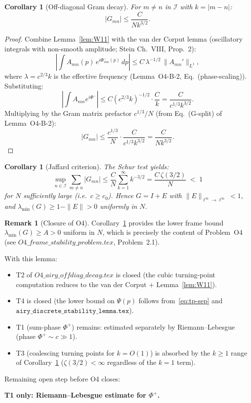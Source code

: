 \documentclass[12pt,a4paper]{amsart}
\newtheorem{corollary}[theorem]{Corollary}
\theoremstyle{definition}
\newtheorem{remark}[theorem]{Remark}
\newcommand{\norm}[1]{\|#1\|}
\newcommand{\dd}{\,d}
\begin{document}
\begin{corollary}[Off-diagonal Gram decay]\label{cor:offdiag}
For $m \neq n$ in $\mathcal{I}$ with $k = |m-n|$:
\[
  |G_{mn}| \leq \frac{C}{N k^{3/2}}.
\]
\end{corollary}

\begin{proof}
Combine Lemma~\ref{lem:W11} with the van der Corput
lemma (oscillatory integrals with non-smooth amplitude;
Stein \cite{Stein1993} Ch.~VIII, Prop.~2):
\[
  \left|\int A_{mn}(p)\, e^{i\Phi^-_{mn}(p)}\dd p\right|
  \leq C\, \lambda^{-1/2}\,\norm{A_{mn}'}_{L^1},
\]
where $\lambda = c^{2/3}k$ is the effective frequency
(Lemma~O4-B-2, Eq.~(phase-scaling)).
Substituting:
\[
  \left|\int A_{mn} e^{i\Phi^-}\right|
  \leq C(c^{2/3}k)^{-1/2}\cdot\frac{C}{k}
  = \frac{C}{c^{1/3} k^{3/2}}.
\]
Multiplying by the Gram matrix prefactor $c^{1/3}/N$
(from Eq.~(G-split) of Lemma~O4-B-2):
\[
  |G_{mn}| \leq \frac{c^{1/3}}{N}\cdot\frac{C}{c^{1/3}k^{3/2}}
  = \frac{C}{Nk^{3/2}}.
\]
\end{proof}

\begin{corollary}[Jaffard criterion]\label{cor:jaffard}
The Schur test yields:
\[
  \sup_{n \in \mathcal{I}}\sum_{m \neq n} |G_{mn}|
  \leq \frac{C}{N}\sum_{k=1}^{\infty} k^{-3/2}
  = \frac{C\,\zeta(3/2)}{N}
  \;<\; 1
\]
for $N$ sufficiently large (i.e.\ $c \geq c_0$).
Hence $G = I + E$ with $\|E\|_{\ell^\infty \to \ell^\infty} < 1$,
and $\lambda_{\min}(G) \geq 1 - \|E\| > 0$ uniformly in $N$.
\end{corollary}

\begin{remark}[Closure of O4]
Corollary~\ref{cor:jaffard} provides the lower frame bound
$\lambda_{\min}(G) \geq A > 0$ uniform in $N$,
which is precisely the content of Problem~O4
(see $O4\_frame\_stability\_problem.tex$, Problem~2.1).

With this lemma:
\begin{itemize}
  \item T2 of $O4\_airy\_offdiag\_decay.tex$ is closed
        (the cubic turning-point computation reduces to
        the van der Corput + Lemma~\ref{lem:W11}).
  \item T4 is closed
        (the lower bound on $\Psi(p)$ follows from~\eqref{eq:tp-sep}
        and $\texttt{airy\_discrete\_stability\_lemma.tex}$).
  \item T1 (sum-phase $\Phi^+$) remains: estimated separately
        by Riemann--Lebesgue (phase $\Phi^+ \sim c \gg 1$).
  \item T3 (coalescing turning points for $k = O(1)$) is absorbed
        by the $k \geq 1$ range of Corollary~\ref{cor:jaffard}
        ($\zeta(3/2) < \infty$ regardless of the $k=1$ term).
\end{itemize}
Remaining open step before O4 closes:
\begin{center}
  \textbf{T1 only: Riemann--Lebesgue estimate for $\Phi^+$.}
\end{center}
\end{remark}
\end{document}
